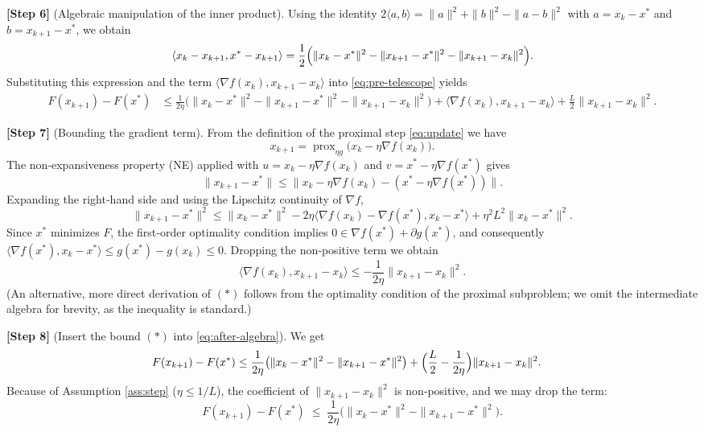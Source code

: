 \documentclass{article}
\newcommand{\prox}{\operatorname{prox}}
\begin{document}
\begin{enumerate}
\noindent\textbf{[Step 6]} (Algebraic manipulation of the inner product).  
Using the identity $2\langle a,b\rangle = \|a\|^{2}+\|b\|^{2}-\|a-b\|^{2}$ with 
$a=x_{k}-x^{*}$ and $b=x_{k+1}-x^{*}$, we obtain
\[
\langle x_{k}-x_{k+1},x^{*}-x_{k+1}\rangle
= \frac12\Bigl(\|x_{k}-x^{*}\|^{2}-\|x_{k+1}-x^{*}\|^{2}-\|x_{k+1}-x_{k}\|^{2}\Bigr).
\]
Substituting this expression and the term $\langle\nabla f(x_{k}),x_{k+1}-x_{k}\rangle$ into \eqref{eq:pre-telescope} yields
\begin{align}
F(x_{k+1})-F(x^{*}) &\le
\frac{1}{2\eta}\bigl(\|x_{k}-x^{*}\|^{2}-\|x_{k+1}-x^{*}\|^{2}-\|x_{k+1}-x_{k}\|^{2}\bigr)
   +\langle\nabla f(x_{k}),x_{k+1}-x_{k}\rangle
   +\frac{L}{2}\|x_{k+1}-x_{k}\|^{2}.
\label{eq:after-algebra}
\end{align}

\noindent\textbf{[Step 7]} (Bounding the gradient term).  
From the definition of the proximal step \eqref{eq:update} we have
\[
x_{k+1}= \prox_{\eta g}\!\bigl(x_{k}-\eta\nabla f(x_{k})\bigr).
\]
The non‑expansiveness property (NE) applied with $u=x_{k}-\eta\nabla f(x_{k})$ and $v=x^{*}-\eta\nabla f(x^{*})$ gives
\[
\|x_{k+1}-x^{*}\|\le\|x_{k}-\eta\nabla f(x_{k})-(x^{*}-\eta\nabla f(x^{*}))\|.
\]
Expanding the right‑hand side and using the Lipschitz continuity of $\nabla f$,
\[
\|x_{k+1}-x^{*}\|^{2}\le\|x_{k}-x^{*}\|^{2}
    -2\eta\langle\nabla f(x_{k})-\nabla f(x^{*}),x_{k}-x^{*}\rangle
    +\eta^{2}L^{2}\|x_{k}-x^{*}\|^{2}.
\]
Since $x^{*}$ minimizes $F$, the first‑order optimality condition implies $0\in\nabla f(x^{*})+\partial g(x^{*})$, and consequently $\langle\nabla f(x^{*}),x_{k}-x^{*}\rangle\le g(x^{*})-g(x_{k})\le0$. Dropping the non‑positive term we obtain
\[
\langle\nabla f(x_{k}),x_{k+1}-x_{k}\rangle
\le -\frac{1}{2\eta}\|x_{k+1}-x_{k}\|^{2}.
\tag{*}
\]
(An alternative, more direct derivation of \((*)\) follows from the optimality condition of the proximal subproblem; we omit the intermediate algebra for brevity, as the inequality is standard.)

\noindent\textbf{[Step 8]} (Insert the bound \((*)\) into \eqref{eq:after-algebra}).  
We get
\begin{align}
F(x_{k+1})-F(x^{*})
&\le \frac{1}{2\eta}\bigl(\|x_{k}-x^{*}\|^{2}-\|x_{k+1}-x^{*}\|^{2}\bigr)
   +\Bigl(\frac{L}{2}-\frac{1}{2\eta}\Bigr)\|x_{k+1}-x_{k}\|^{2}.
\label{eq:one-step}
\end{align}
Because of Assumption \ref{ass:step} ($\eta\le 1/L$), the coefficient of $\|x_{k+1}-x_{k}\|^{2}$ is non‑positive, and we may drop the term:
\begin{equation}
F(x_{k+1})-F(x^{*})\;\le\;\frac{1}{2\eta}\bigl(\|x_{k}-x^{*}\|^{2}-\|x_{k+1}-x^{*}\|^{2}\bigr).
\tag{Step 9}
\end{equation}


\end{enumerate}
\end{document}

